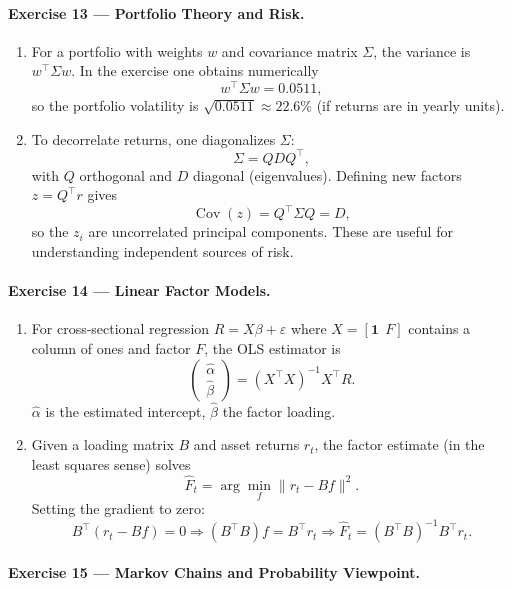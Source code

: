 \documentclass[11pt]{article}
\begin{document}
\paragraph{Exercise 13 — Portfolio Theory and Risk.}

\begin{enumerate}
\item For a portfolio with weights $w$ and covariance matrix $\Sigma$, the variance is $w^\top\Sigma w$. In the exercise one obtains numerically
\[
w^\top\Sigma w = 0.0511,
\]
so the portfolio volatility is $\sqrt{0.0511}\approx 22.6\%$ (if returns are in yearly units).

\item To decorrelate returns, one diagonalizes $\Sigma$:
\[
\Sigma = Q D Q^\top,
\]
with $Q$ orthogonal and $D$ diagonal (eigenvalues).  
Defining new factors $z = Q^\top r$ gives
\[
\operatorname{Cov}(z)=Q^\top \Sigma Q = D,
\]
so the $z_i$ are uncorrelated principal components. These are useful for understanding independent sources of risk.
\end{enumerate}

\bigskip

\paragraph{Exercise 14 — Linear Factor Models.}

\begin{enumerate}
\item For cross-sectional regression $R=X\beta+\varepsilon$ where $X=[\mathbf 1\ \ F]$ contains a column of ones and factor $F$, the OLS estimator is
\[
\begin{pmatrix}
\hat\alpha\\
\hat\beta
\end{pmatrix}
=(X^\top X)^{-1}X^\top R.
\]
$\hat\alpha$ is the estimated intercept, $\hat\beta$ the factor loading.

\item Given a loading matrix $B$ and asset returns $r_t$, the factor estimate (in the least squares sense) solves
\[
\hat F_t=\arg\min_{f}\|r_t-Bf\|^2.
\]
Setting the gradient to zero:
\[
B^\top (r_t - B f)=0
\Rightarrow
(B^\top B) f = B^\top r_t
\Rightarrow
\hat F_t=(B^\top B)^{-1}B^\top r_t.
\]
\end{enumerate}

\bigskip

\paragraph{Exercise 15 — Markov Chains and Probability Viewpoint.}
\end{document}
